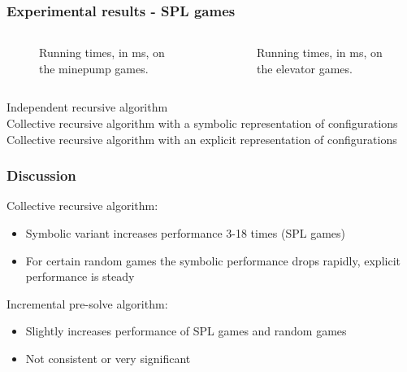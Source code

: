 \documentclass[aspectratio=169]{beamer}
\begin{document}
\begin{frame}[t]
\frametitle{Experimental results - SPL games}
\def\scalegraphs{0.6}
\begin{columns}[T]
	\begin{column}{0.5\textwidth}
		\begin{figure}[H]
			
			\caption{Running times, in ms, on the minepump games.}
			\label{fig:results_minepump}
		\end{figure}%
	\end{column}
	\begin{column}{0.5\textwidth}
		\begin{figure}[H]
			
			\caption{Running times, in ms, on the elevator games.}
			\label{fig:results_elevator}
		\end{figure}%
	\end{column}
\end{columns}
\small
{} Independent recursive algorithm\\
 Collective recursive algorithm with a symbolic representation of configurations\\
 Collective recursive algorithm with an explicit representation of configurations\\
\end{frame}



\begin{frame}[t]
\frametitle{Discussion}
	\large Collective recursive algorithm:\\
	\begin{itemize}
		\item Symbolic variant increases performance 3-18 times (SPL games)
		\item For certain random games the symbolic performance drops rapidly, explicit performance is steady
	\end{itemize}\pause
	\large Incremental pre-solve algorithm:\\
	\begin{itemize}
		\item Slightly increases performance of SPL games and random games
		\item Not consistent or very significant
	\end{itemize}
\end{frame}
\end{document}
